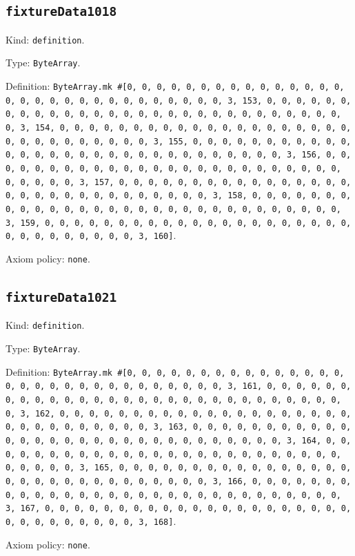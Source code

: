 \documentclass[11pt]{article}
\begin{document}
\subsection*{\texttt{fixtureData1018}}
\noindent Kind: \texttt{definition}.\par
\noindent Type: \texttt{ByteArray}.\par
\noindent Definition: \texttt{ByteArray.mk \#[0, 0, 0, 0, 0, 0, 0, 0, 0, 0, 0, 0, 0, 0, 0, 0, 0, 0, 0, 0, 0, 0, 0, 0, 0, 0, 0, 0, 0, 0, 3, 153, 0, 0, 0, 0, 0, 0, 0, 0, 0, 0, 0, 0, 0, 0, 0, 0, 0, 0, 0, 0, 0, 0, 0, 0, 0, 0, 0, 0, 0, 0, 3, 154, 0, 0, 0, 0, 0, 0, 0, 0, 0, 0, 0, 0, 0, 0, 0, 0, 0, 0, 0, 0, 0, 0, 0, 0, 0, 0, 0, 0, 0, 0, 3, 155, 0, 0, 0, 0, 0, 0, 0, 0, 0, 0, 0, 0, 0, 0, 0, 0, 0, 0, 0, 0, 0, 0, 0, 0, 0, 0, 0, 0, 0, 0, 3, 156, 0, 0, 0, 0, 0, 0, 0, 0, 0, 0, 0, 0, 0, 0, 0, 0, 0, 0, 0, 0, 0, 0, 0, 0, 0, 0, 0, 0, 0, 0, 3, 157, 0, 0, 0, 0, 0, 0, 0, 0, 0, 0, 0, 0, 0, 0, 0, 0, 0, 0, 0, 0, 0, 0, 0, 0, 0, 0, 0, 0, 0, 0, 3, 158, 0, 0, 0, 0, 0, 0, 0, 0, 0, 0, 0, 0, 0, 0, 0, 0, 0, 0, 0, 0, 0, 0, 0, 0, 0, 0, 0, 0, 0, 0, 3, 159, 0, 0, 0, 0, 0, 0, 0, 0, 0, 0, 0, 0, 0, 0, 0, 0, 0, 0, 0, 0, 0, 0, 0, 0, 0, 0, 0, 0, 0, 0, 3, 160]}.\par
\noindent Axiom policy: \texttt{none}.\par
\subsection*{\texttt{fixtureData1021}}
\noindent Kind: \texttt{definition}.\par
\noindent Type: \texttt{ByteArray}.\par
\noindent Definition: \texttt{ByteArray.mk \#[0, 0, 0, 0, 0, 0, 0, 0, 0, 0, 0, 0, 0, 0, 0, 0, 0, 0, 0, 0, 0, 0, 0, 0, 0, 0, 0, 0, 0, 0, 3, 161, 0, 0, 0, 0, 0, 0, 0, 0, 0, 0, 0, 0, 0, 0, 0, 0, 0, 0, 0, 0, 0, 0, 0, 0, 0, 0, 0, 0, 0, 0, 3, 162, 0, 0, 0, 0, 0, 0, 0, 0, 0, 0, 0, 0, 0, 0, 0, 0, 0, 0, 0, 0, 0, 0, 0, 0, 0, 0, 0, 0, 0, 0, 3, 163, 0, 0, 0, 0, 0, 0, 0, 0, 0, 0, 0, 0, 0, 0, 0, 0, 0, 0, 0, 0, 0, 0, 0, 0, 0, 0, 0, 0, 0, 0, 3, 164, 0, 0, 0, 0, 0, 0, 0, 0, 0, 0, 0, 0, 0, 0, 0, 0, 0, 0, 0, 0, 0, 0, 0, 0, 0, 0, 0, 0, 0, 0, 3, 165, 0, 0, 0, 0, 0, 0, 0, 0, 0, 0, 0, 0, 0, 0, 0, 0, 0, 0, 0, 0, 0, 0, 0, 0, 0, 0, 0, 0, 0, 0, 3, 166, 0, 0, 0, 0, 0, 0, 0, 0, 0, 0, 0, 0, 0, 0, 0, 0, 0, 0, 0, 0, 0, 0, 0, 0, 0, 0, 0, 0, 0, 0, 3, 167, 0, 0, 0, 0, 0, 0, 0, 0, 0, 0, 0, 0, 0, 0, 0, 0, 0, 0, 0, 0, 0, 0, 0, 0, 0, 0, 0, 0, 0, 0, 3, 168]}.\par
\noindent Axiom policy: \texttt{none}.\par
\end{document}
